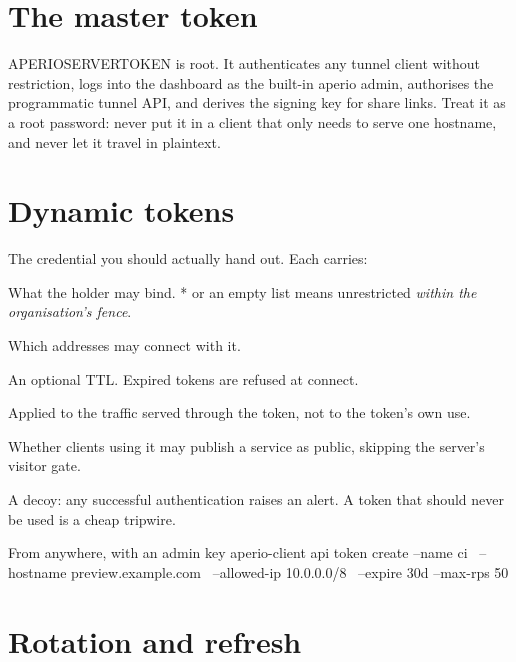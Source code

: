 \documentclass[11pt,a4paper,oneside]{book}
\newcommand{\aperiobreakableunderscore}{\textunderscore\allowbreak}
\newcommand{\aperiocodebreaks}{\XeTeXinterchartokenstate=1 }
\newcommand{\aperiocodebreaks}{}
\DeclareRobustCommand{\code}[1]{{\ttfamily\small\aperiocodebreaks
  \let\_\aperiobreakableunderscore#1}}
\begin{document}
\section{The master token}

\code{APERIO\_SERVER\_TOKEN} is root. It authenticates any tunnel client
without restriction, logs into the dashboard as the built-in \code{aperio}
admin, authorises the programmatic tunnel API, and derives the signing key
for share links. Treat it as a root password: never put it in a client
that only needs to serve one hostname, and never let it travel in
plaintext.

\section{Dynamic tokens}

The credential you should actually hand out. Each carries:

\begin{description}[leftmargin=1.6em,style=nextline]
  \item[Hostname and path permissions] What the holder may bind.
        \code{*} or an empty list means unrestricted \emph{within the
        organisation's fence}.
  \item[Source IP allowlist] Which addresses may connect with it.
  \item[Lifetime] An optional TTL. Expired tokens are refused at connect.
  \item[Rate limit and daily quota] Applied to the traffic served through
        the token, not to the token's own use.
  \item[\code{allow\_public}] Whether clients using it may publish a
        service as public, skipping the server's visitor gate.
  \item[\code{canary}] A decoy: any successful authentication raises an
        alert. A token that should never be used is a cheap tripwire.
\end{description}

\begin{codecard}[aperiosh]{From anywhere, with an admin key}
aperio-client api token create --name ci \
  --hostname preview.example.com \
  --allowed-ip 10.0.0.0/8 \
  --expire 30d --max-rps 50
\end{codecard}

\section{Rotation and refresh}
\end{document}
